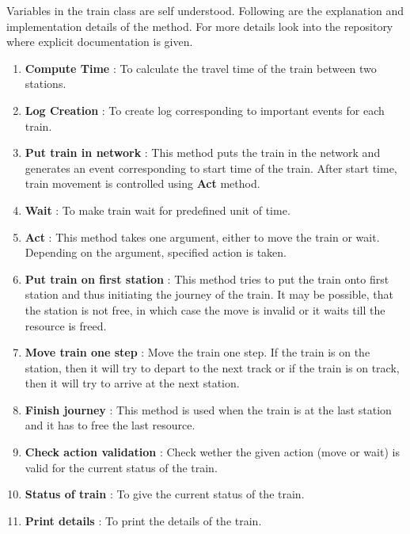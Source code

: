 Variables in the train class are self understood. Following are the explanation and implementation details of 
the method. For more details look into the repository where explicit documentation is given.
\begin{enumerate}
\item \textbf{Compute Time} : To calculate the travel time of the train between two stations.
\item \textbf{Log Creation} : To create log corresponding to important events for each train.
\item \textbf{Put train in network} : This method puts the train in the network and generates an event 
                                    corresponding to start time of the train. After start time, train movement is 
                                    controlled using \textbf{Act} method.
\item \textbf{Wait} : To make train wait for predefined unit of time.
\item \textbf{Act} : This method takes one argument, either to move the train or wait. Depending on the 
                    argument, specified action is taken.
\item \textbf{Put train on first station} : This method tries to put the train onto first station and thus 
                            initiating the journey of the train. It may be possible, that the station is not 
                            free, in which case the move is invalid or it waits till the resource is freed.
\item \textbf{Move train one step} : Move the train one step. If the train is on the station, then it will try to 
                                depart to the next track or if the train is on track, then it will try to arrive at the 
                                next station.
\item \textbf{Finish journey} : This method is used when the train is at the last station and it has to 
                                free the last resource.
\item \textbf{Check action validation} : Check wether the given action (move or wait) is valid for the current status of the train.
\item \textbf{Status of train} : To give the current status of the train.
\item \textbf{Print details} : To print the details of the train.
\end{enumerate}

